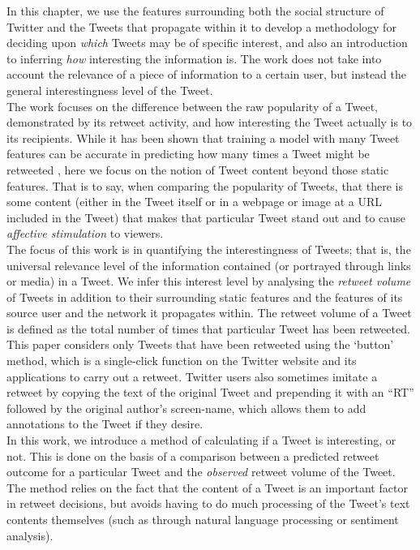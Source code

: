 In this chapter, we use the features surrounding both the social structure of Twitter and the Tweets that propagate within it to develop a methodology for deciding upon \textit{which} Tweets may be of specific interest, and also an introduction to inferring \textit{how} interesting the information is. The work does not take into account the relevance of a piece of information to a certain user, but instead the general interestingness level of the Tweet.\\
The work focuses on the difference between the raw popularity of a Tweet, demonstrated by its retweet activity, and how interesting the Tweet actually is to its recipients. While it has been shown that training a model with many Tweet features can be accurate in predicting how many times a Tweet might be retweeted \cite{zhu11}, here we focus on the notion of Tweet content beyond those static features. That is to say, when comparing the popularity of Tweets, that there is some content (either in the Tweet itself or in a webpage or image at a URL included in the Tweet) that makes that particular Tweet stand out and to cause \textit{affective stimulation} \cite{xu07} to viewers.\\
The focus of this work is in quantifying the interestingness of Tweets; that is, the universal relevance level of the information contained (or portrayed through links or media) in a Tweet. We infer this interest level by analysing the \textit{retweet volume} of Tweets in addition to their surrounding static features and the features of its source user and the network it propagates within. The retweet volume of a Tweet is defined as the total number of times that particular Tweet has been retweeted. \\
This paper considers only Tweets that have been retweeted using the `button' method, which is a single-click function on the Twitter website and its applications to carry out a retweet. Twitter users also sometimes imitate a retweet by copying the text of the original Tweet and prepending it with an ``RT'' followed by the original author's screen-name, which allows them to add annotations to the Tweet if they desire.\\ 
In this work, we introduce a method of calculating if a Tweet is interesting, or not. This is done on the basis of a comparison between a predicted retweet outcome for a particular Tweet and the \textit{observed} retweet volume of the Tweet. The method relies on the fact that the content of a Tweet is an important factor in retweet decisions, but avoids having to do much processing of the Tweet's text contents themselves (such as through natural language processing or sentiment analysis).\\
